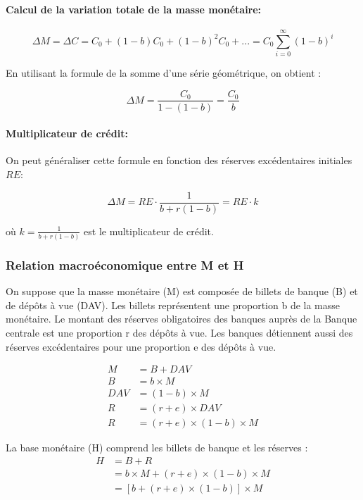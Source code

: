 \documentclass[a4paper, 12pt]{report}
\begin{document}
\paragraph{Calcul de la variation totale de la masse monétaire:}

$$\Delta M = \Delta C = C_0 + (1-b)C_0 + (1-b)^2C_0 + ... = C_0 \sum_{i=0}^{\infty} (1-b)^i$$

En utilisant la formule de la somme d'une série géométrique, on obtient :

$$\Delta M = \frac{C_0}{1-(1-b)} = \frac{C_0}{b}$$

\paragraph{Multiplicateur de crédit:}

On peut généraliser cette formule en fonction des réserves excédentaires initiales $RE$:

$$\Delta M = RE \cdot \frac{1}{b + r(1-b)} = RE \cdot k$$

où $k = \frac{1}{b + r(1-b)}$ est le multiplicateur de crédit.
	
\subsubsection{Relation macroéconomique entre M et H}
	
On suppose que la masse monétaire (M) est composée de billets de banque (B) et de dépôts à vue (DAV). Les billets représentent une proportion b de la masse monétaire. Le montant des réserves obligatoires des banques auprès de la Banque centrale est une proportion r des dépôts à vue. Les banques détiennent aussi des réserves excédentaires pour une proportion e des dépôts à vue.

\begin{align*}
	M &= B + DAV \\
	B &= b \times M \\
	DAV &= (1 - b) \times M \\
	R &= (r + e) \times DAV \\
	R &= (r + e) \times (1 - b) \times M
\end{align*}

La base monétaire (H) comprend les billets de banque et les réserves :
\begin{align*}
	H &= B + R \\
	&= b \times M + (r + e) \times (1 - b) \times M \\
	&= [b + (r + e) \times (1 - b)] \times M
\end{align*}
\end{document}
